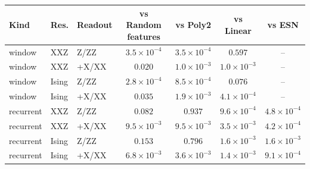 \begin{tabular}{lllcccc}
\toprule
Kind & Res. & Readout & vs Random features & vs Poly2 & vs Linear & vs ESN \\
\midrule
window & XXZ & Z/ZZ & $3.5\times10^{-4}$ & $3.5\times10^{-4}$ & $0.597$ & -- \\
window & XXZ & +X/XX & $0.020$ & $1.0\times10^{-3}$ & $1.0\times10^{-3}$ & -- \\
window & Ising & Z/ZZ & $2.8\times10^{-4}$ & $8.5\times10^{-4}$ & $0.076$ & -- \\
window & Ising & +X/XX & $0.035$ & $1.9\times10^{-3}$ & $4.1\times10^{-4}$ & -- \\
\midrule
recurrent & XXZ & Z/ZZ & $0.082$ & $0.937$ & $9.6\times10^{-4}$ & $4.8\times10^{-4}$ \\
recurrent & XXZ & +X/XX & $9.5\times10^{-3}$ & $9.5\times10^{-3}$ & $3.5\times10^{-3}$ & $4.2\times10^{-4}$ \\
recurrent & Ising & Z/ZZ & $0.153$ & $0.796$ & $1.6\times10^{-3}$ & $1.6\times10^{-3}$ \\
recurrent & Ising & +X/XX & $6.8\times10^{-3}$ & $3.6\times10^{-3}$ & $1.4\times10^{-3}$ & $9.1\times10^{-4}$ \\
\bottomrule
\end{tabular}
